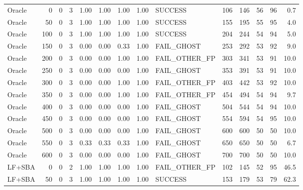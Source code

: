 \begin{tabular}{lrrr|rrrr|lrr|rr|r}
  Oracle                         &    0 &    0 &   3 & 1.00 & 1.00 & 1.00 & 1.00 & SUCCESS         &   106 &   146 &    56 &    96 &   0.7 \\
  Oracle                         &   50 &    0 &   3 & 1.00 & 1.00 & 1.00 & 1.00 & SUCCESS         &   155 &   195 &    55 &    95 &   4.0 \\
  Oracle                         &  100 &    0 &   3 & 1.00 & 1.00 & 1.00 & 1.00 & SUCCESS         &   204 &   244 &    54 &    94 &   5.0 \\
  Oracle                         &  150 &    0 &   3 & 0.00 & 0.00 & 0.33 & 1.00 & FAIL_GHOST      &   253 &   292 &    53 &    92 &   9.0 \\
  Oracle                         &  200 &    0 &   3 & 0.00 & 0.00 & 1.00 & 1.00 & FAIL_OTHER_FP   &   303 &   341 &    53 &    91 &  10.0 \\
  Oracle                         &  250 &    0 &   3 & 0.00 & 0.00 & 0.00 & 1.00 & FAIL_GHOST      &   353 &   391 &    53 &    91 &  10.0 \\
  Oracle                         &  300 &    0 &   3 & 0.00 & 0.00 & 1.00 & 1.00 & FAIL_OTHER_FP   &   403 &   442 &    53 &    92 &  10.0 \\
  Oracle                         &  350 &    0 &   3 & 0.00 & 0.00 & 1.00 & 1.00 & FAIL_OTHER_FP   &   454 &   494 &    54 &    94 &   9.7 \\
  Oracle                         &  400 &    0 &   3 & 0.00 & 0.00 & 0.00 & 1.00 & FAIL_GHOST      &   504 &   544 &    54 &    94 &  10.0 \\
  Oracle                         &  450 &    0 &   3 & 0.00 & 0.00 & 0.00 & 1.00 & FAIL_GHOST      &   554 &   594 &    54 &    95 &  10.0 \\
  Oracle                         &  500 &    0 &   3 & 0.00 & 0.00 & 0.00 & 1.00 & FAIL_GHOST      &   600 &   600 &    50 &    50 &  10.0 \\
  Oracle                         &  550 &    0 &   3 & 0.33 & 0.33 & 0.33 & 1.00 & FAIL_GHOST      &   650 &   650 &    50 &    50 &   6.7 \\
  Oracle                         &  600 &    0 &   3 & 0.00 & 0.00 & 0.00 & 1.00 & FAIL_GHOST      &   700 &   700 &    50 &    50 &  10.0 \\
  LF+SBA                         &    0 &    0 &   2 & 1.00 & 1.00 & 1.00 & 1.00 & FAIL_OTHER_FP   &   102 &   145 &    52 &    95 &  46.5 \\
  LF+SBA                         &   50 &    0 &   3 & 1.00 & 1.00 & 1.00 & 1.00 & SUCCESS         &   153 &   179 &    53 &    79 &  62.3 \\

\end{tabular}
